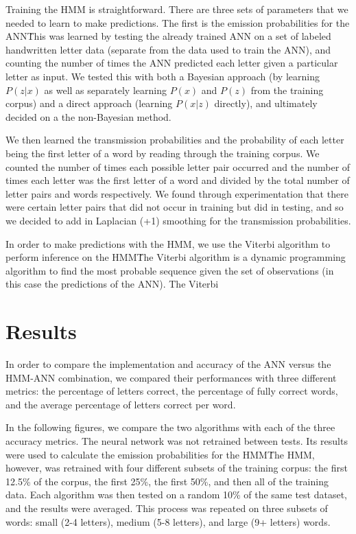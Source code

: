 \documentclass[11pt,a4paper,twocolumn]{article}
\begin{document}
Training the HMM is straightforward. There are three sets of parameters
that we needed to learn to make predictions. The first is the emission
probabilities for the ANN\. This was learned by testing the already
trained ANN on a set of labeled handwritten letter data (separate from the
data used to train the ANN), and counting the number of times the ANN predicted
each letter given a particular letter as input. We tested this with both a Bayesian
approach (by learning $P(z|x)$ as well as separately learning $P(x)$ and $P(z)$
from the training corpus) and a direct approach (learning $P(x|z)$ directly), and ultimately
decided on a the non-Bayesian method.

We then learned the transmission probabilities and the probability of each letter being the first
letter of a word by reading through the training corpus. We counted the number of times each
possible letter pair occurred and the number of times each letter was the first letter of a word and
divided by the total number of letter pairs and words respectively. We found through experimentation
that there were certain letter pairs that did not occur in training but did in testing, and so we
decided to add in Laplacian (+1) smoothing for the transmission probabilities.

In order to make predictions with the HMM, we use the Viterbi algorithm to perform inference
on the HMM\. The Viterbi algorithm is a dynamic programming algorithm to find the most probable
sequence given the set of observations (in this case the predictions of the ANN). The Viterbi


\section{Results}

In order to compare the implementation and accuracy of the ANN versus the
HMM-ANN combination, we compared their performances with three different
metrics: the percentage of letters correct, the
percentage of fully correct words, and the average percentage of letters correct per word.

In the following figures, we compare the two algorithms with each of the three accuracy metrics. The
neural network was not retrained between tests. Its results were used to calculate the emission
probabilities for the HMM\. The HMM, however, was retrained with four different subsets of the
training corpus: the first 12.5\% of the corpus, the first 25\%, the first 50\%, and then all of the
training data. Each algorithm was then tested on a random 10\% of the same test dataset, and the
results were averaged. This process was repeated on three subsets of words: small (2-4 letters),
medium (5-8 letters), and large (9+ letters) words.
\end{document}
